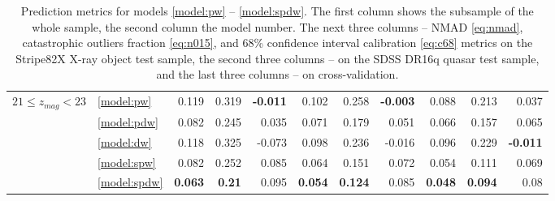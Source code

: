 \documentclass[fleqn,usenatbib]{mnras}
\begin{document}
\begin{table}
\begin{tabular}{llrrrrrrrrr}
\hline
            $21 \leq z_{mag} < 23$ & \ref{model:pw} &                0.119 &           0.319 &  \textbf{-0.011} &            0.102 &           0.258 &  \textbf{-0.003} &            0.088 &           0.213 &            0.037 \\
                                   & \ref{model:pdw} &                0.082 &           0.245 &            0.035 &            0.071 &           0.179 &            0.051 &            0.066 &           0.157 &            0.065 \\
                                   & \ref{model:dw} &                0.118 &           0.325 &           -0.073 &            0.098 &           0.236 &           -0.016 &            0.096 &           0.229 &  \textbf{-0.011} \\
                                   & \ref{model:spw} &                0.082 &           0.252 &            0.085 &            0.064 &           0.151 &            0.072 &            0.054 &           0.111 &            0.069 \\
                                   & \ref{model:spdw} &       \textbf{0.063} &   \textbf{0.21} &            0.095 &   \textbf{0.054} &  \textbf{0.124} &            0.085 &   \textbf{0.048} &  \textbf{0.094} &             0.08 \\
\hline
            \hline
            \end{tabular}
            \caption{Prediction metrics for models \ref{model:pw} -- \ref{model:spdw}. The first column shows the subsample of the whole sample, the second column the model number. The next three columns -- NMAD \eqref{eq:nmad}, catastrophic outliers fraction \eqref{eq:n015}, and 68\% confidence interval calibration \eqref{eq:c68} metrics on the Stripe82X X-ray object test sample, the second three columns -- on the SDSS DR16q quasar test sample, and the last three columns -- on cross-validation.}
            \label{tab:total_metrics_table}
\end{table}
\end{document}
